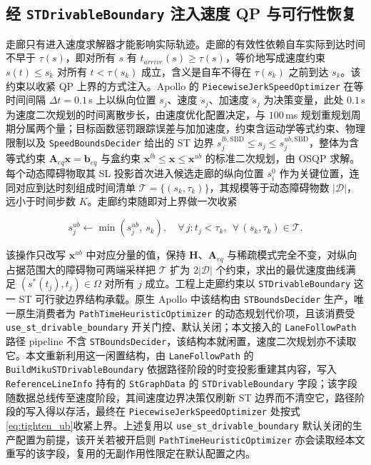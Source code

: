 \documentclass[a4paper,zihao=5]{ctexart}
\theoremstyle{definition}
\begin{document}
\subsection{经 \texttt{STDrivableBoundary} 注入速度 QP 与可行性恢复}
\label{sec:method_inject}

走廊只有进入速度求解器才能影响实际轨迹。走廊的有效性依赖自车实际到达时间不早于 $\tau(s)$，即对所有 $s$ 有 $t_{arrive}(s)\geq\tau(s)$，等价地写成速度约束 $s(t)\leq s_k$ 对所有 $t<\tau(s_k)$ 成立，含义是自车不得在 $\tau(s_k)$ 之前到达 $s_k$。该约束以收紧 QP 上界的方式注入。Apollo 的 \texttt{PiecewiseJerkSpeedOptimizer} 在等时间间隔 $\Delta t = 0.1$\,s 上以纵向位置 $s_j$、速度 $\dot{s}_j$、加速度 $\ddot{s}_j$ 为决策变量，此处 $0.1$\,s 为速度二次规划的时间离散步长，由速度优化配置决定，与 $100$\,ms 规划重规划周期分属两个量；目标函数惩罚跟踪误差与加加速度，约束含运动学等式约束、物理限制以及 \texttt{SpeedBoundsDecider} 给出的 ST 边界 $s_j^{lb,\mathrm{SBD}} \leq s_j \leq s_j^{ub,\mathrm{SBD}}$，整体为含等式约束 $\mathbf{A}_{eq}\mathbf{x} = \mathbf{b}_{eq}$ 与盒约束 $\mathbf{x}^{lb} \leq \mathbf{x} \leq \mathbf{x}^{ub}$ 的标准二次规划，由 OSQP 求解。每个动态障碍物取其 SL 投影首次进入候选走廊的纵向位置 $s_i^{0}$ 作为关键位置，连同对应到达时刻组成时间清单 $\mathcal{T} = \{(s_k, \tau_k)\}$，其规模等于动态障碍物数 $|\mathcal{D}|$，远小于时间步数 $K$。走廊约束随即对上界做一次收紧

\begin{equation}
    s_j^{ub} \leftarrow \min\!\left(s_j^{ub},\ s_k\right), \quad \forall\, j: t_j < \tau_k,\ \ \forall\, (s_k, \tau_k) \in \mathcal{T}.
    \label{eq:tighten_ub}
\end{equation}

该操作只改写 $\mathbf{x}^{ub}$ 中对应分量的值，保持 $\mathbf{H}$、$\mathbf{A}_{eq}$ 与稀疏模式完全不变，对纵向占据范围大的障碍物可两端采样把 $\mathcal{T}$ 扩为 $2|\mathcal{D}|$ 个约束，求出的最优速度曲线满足 $(s^{*}(t_j), t_j) \in \Omega$ 对所有 $j$ 成立。工程上走廊约束以 \texttt{STDrivableBoundary} 这一 ST 可行驶边界结构承载。原生 Apollo 中该结构由 \texttt{STBoundsDecider} 生产，唯一原生消费者为 \texttt{PathTimeHeuristicOptimizer} 的动态规划代价项，且该消费受 \texttt{use\_st\_drivable\_boundary} 开关门控、默认关闭；本文接入的 \texttt{LaneFollowPath} 路径 pipeline 不含 \texttt{STBoundsDecider}，该结构本就闲置，速度二次规划亦不读取它。本文重新利用这一闲置结构，由 \texttt{LaneFollowPath} 的 \texttt{BuildMikuSTDrivableBoundary} 依据路径阶段的时变投影重建其内容，写入 \texttt{ReferenceLineInfo} 持有的 \texttt{StGraphData} 的 \texttt{STDrivableBoundary} 字段；该字段随数据总线传至速度阶段，其间速度边界决策仅刷新 ST 边界而不清空它，路径阶段的写入得以存活，最终在 \texttt{PiecewiseJerkSpeedOptimizer} 处按式\eqref{eq:tighten_ub}收紧上界。上述复用以 \texttt{use\_st\_drivable\_boundary} 默认关闭的生产配置为前提，该开关若被开启则 \texttt{PathTimeHeuristicOptimizer} 亦会读取经本文重写的该字段，复用的无副作用性限定在默认配置之内。
\end{document}
